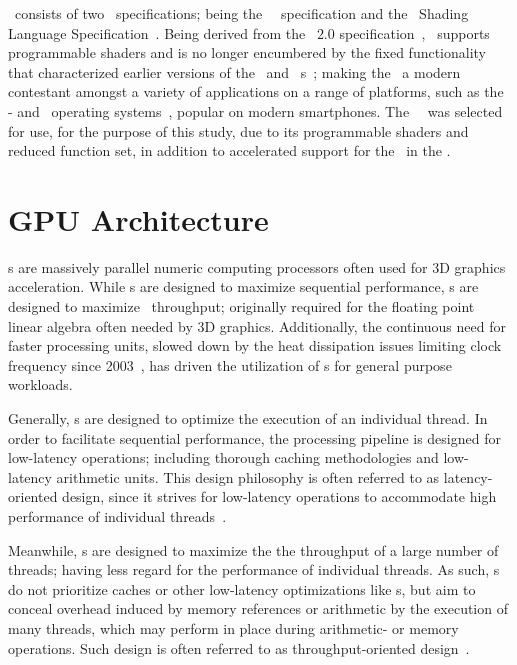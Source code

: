 \dvttermopenglestwopointo\ consists of two \dvttermkhronos\ specifications; being the \dvttermopenglestwopointo\ \dvttermapi\ specification and the \dvttermopengles\ Shading Language Specification~.
Being derived from the \dvttermopengl ~$2.0$ specification~, \dvttermopenglestwopointo\ supports programmable shaders and is no longer encumbered by the fixed functionality that characterized earlier versions of the \dvttermopengl\ and \dvttermopengles\ \dvttermapi s~; making the \dvttermapi\ a modern contestant amongst a variety of applications on a range of platforms, such as the \dvttermandroid - and \dvttermios\ operating systems~, popular on modern smartphones.
The \dvttermopenglestwopointo\ \dvttermapi\ was selected for use, for the purpose of this study, due to its programmable shaders and reduced function set, in addition to accelerated support for the \dvttermapi\ in the \dvttermandroidemulator .

\section{GPU Architecture}
\label{sec:backgroundandrelatedwork_gpuarchitecture}
\dvttermgpu s are massively parallel numeric computing processors often used for 3D graphics acceleration.
While \dvttermcpu s are designed to maximize sequential performance, \dvttermgpu s are designed to maximize \dvttermflops\ throughput; originally required for the floating point linear algebra often needed by 3D graphics.
Additionally, the continuous need for faster processing units, slowed down by the heat dissipation issues limiting clock frequency since 2003~, has driven the utilization of \dvttermgpu s for general purpose workloads.

Generally, \dvttermcpu s are designed to optimize the execution of an individual thread.
In order to facilitate sequential performance, the processing pipeline is designed for low-latency operations; including thorough caching methodologies and low-latency arithmetic units.
This design philosophy is often referred to as latency-oriented design, since it strives for low-latency operations to accommodate high performance of individual threads~.

Meanwhile, \dvttermgpu s are designed to maximize the the throughput of a large number of threads; having less regard for the performance of individual threads.
As such, \dvttermgpu s do not prioritize caches or other low-latency optimizations like \dvttermcpu s, but aim to conceal overhead induced by memory references or arithmetic by the execution of many threads, which may perform in place during arithmetic- or memory operations.
Such design is often referred to as throughput-oriented design~.

